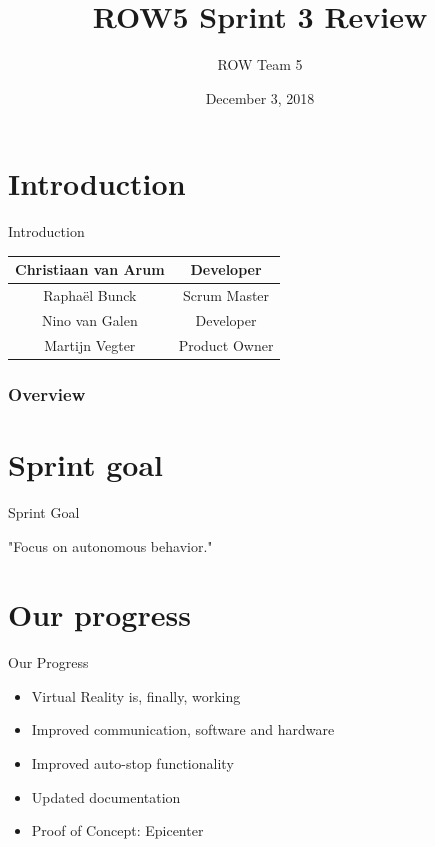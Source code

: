 \documentclass{beamer}
\title[Sprint Review]{ROW5 Sprint 3 Review}
\author{ROW Team 5}
\institute[HvA]
{
	Amsterdam University of Applied Sciences \\
	\textit{https://rescueonwheels.github.io/}
}
\date{December 3, 2018}
\begin{document}
\begin{frame}
\titlepage %
\end{frame}

\section{Introduction}
\begin{frame}{Introduction}
    \begin{center}
        \begin{tabular}{c|c}
             Christiaan van Arum    & Developer \\
             \hline
             Rapha\"{e}l Bunck & Scrum Master \\
             \hline
             Nino van Galen & Developer \\
             \hline
             Martijn Vegter & Product Owner
         \end{tabular}
    \end{center}
\end{frame}

\begin{frame}
\frametitle{Overview} %
\tableofcontents %
\end{frame}

\section{Sprint goal}
\begin{frame}{Sprint Goal}
\normalsize{\centerline{"Focus on autonomous behavior."}}
\end{frame}

\section{Our progress}
\begin{frame}{Our Progress}
    \begin{itemize}
    \item Virtual Reality is, finally, working
    \item Improved communication, software and hardware
    \item Improved auto-stop functionality
    \item Updated documentation
    \item Proof of Concept: Epicenter
\end{itemize}
\end{frame}
\end{document}
